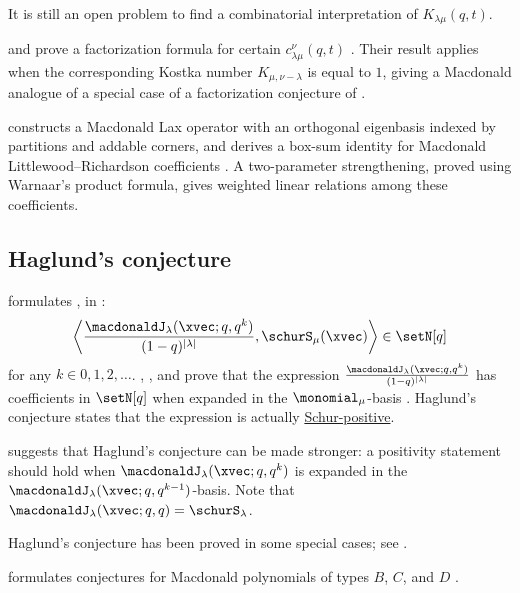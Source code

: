 It is still an open problem to find a combinatorial interpretation of
$K_{\lambda\mu}(q,t)$.

 and  prove a factorization formula
for certain
\label{macdonaldLittlewoodRichardsonCoefficient}
$c^\nu_{\lambda\mu}(q,t)$ \cite{MatveevWei2023x}.  Their result applies when
the corresponding Kostka number $K_{\mu,\nu-\lambda}$ is equal to $1$, giving a
Macdonald analogue of a special case of a factorization conjecture of
.

 constructs a Macdonald Lax operator with an orthogonal
eigenbasis indexed by partitions and addable corners, and derives a box-sum
identity for Macdonald Littlewood--Richardson coefficients
\cite{Mickler2026Lax}. A two-parameter strengthening, proved using Warnaar's
product formula, gives weighted linear relations among these coefficients.



\subsection[macdonaldJHaglundsConjecture]{Haglund's conjecture}

 formulates
\label{haglundMacdonaldConjecture},
in \cite{Haglund2010}:
\[
\left\langle
  \frac{\macdonaldJ_\lambda(\xvec;q,q^k)}{(1-q)^{|\lambda|}},
  \schurS_\mu(\xvec)
\right\rangle
\in \setN[q]
\]
for any $k \in 0,1,2,\dotsc$.
, , and  prove that
the expression
$\frac{\macdonaldJ_\lambda(\xvec;q,q^k)}{(1-q)^{|\lambda|}}$
has coefficients in $\setN[q]$ when expanded in the $\monomial_\mu$-basis
\cite{HaglundHaimanLoehr2005}.
Haglund's conjecture states that the expression is actually
\hyperref[schurPositiveDefinition]{Schur-positive}.

 suggests that Haglund's conjecture can be made stronger:
a positivity statement should hold when $\macdonaldJ_\lambda(\xvec;q,q^k)$
is expanded in the $\macdonaldJ_\lambda(\xvec;q,q^{k-1})$-basis.  Note that
$\macdonaldJ_\lambda(\xvec;q,q)=\schurS_\lambda$.

Haglund's conjecture has been proved in some special cases; see
\cite{Yoo2012,Yoo2015,Bhattacharya2022x}.



 formulates conjectures for Macdonald polynomials of
types $B$, $C$, and $D$ \cite{Lassalle2005x}.


